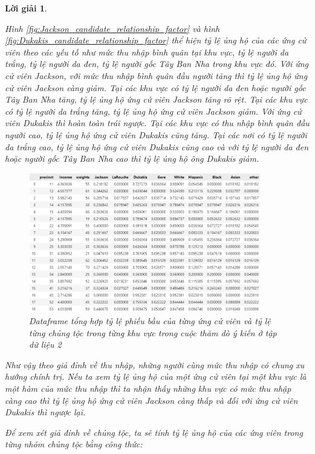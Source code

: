 \documentclass[14pt, a4paper]{article}
\theoremstyle{sltheorem}
\theoremstyle{soltheorem}
\newtheorem*{loigiai}{Lời giải}
\begin{document}
\begin{loigiai}
\begin{enumerate}
    Hình \ref{fig:Jackson_candidate_relationship_factor} và hình \ref{fig:Dukakis_candidate_relationship_factor} thể hiện tỷ lệ ủng hộ của các ứng cử viên theo các yếu tố như mức thu nhập bình quân tại khu vực, tỷ lệ người da trắng, tỷ lệ người da đen, tỷ lệ người gốc Tây Ban Nha trong khu vực đó.
    Với ứng cử viên Jackson, với mức thu nhập bình quân đầu người tăng thì tỷ lệ ủng hộ ứng cử viên Jackson càng giảm.
    Tại các khu vực có tỷ lệ người da đen hoặc người gốc Tây Ban Nha tăng, tỷ lệ ủng hộ ứng cứ viên Jackson tăng rõ rệt.
    Tại các khu vực có tỷ lệ người da trắng tăng, tỷ lệ ủng hộ ứng cử viên Jackson giảm.
    Với ứng cử viên Dukakis thì hoàn toàn trái ngược. Tại các khu vực có thu nhập bình quân đầu người cao, tỷ lệ ủng hộ ứng cử viên Dukakis cũng tăng.
    Tại các nơi có tỷ lệ người da trắng cao, tỷ lệ ủng hộ ứng cử viên Dukakis cũng cao và với tỷ lệ người da đen hoặc người gốc Tây Ban Nha cao thì tỷ lệ ủng hộ ông Dukakis giảm.

    \begin{figure}[H]
        \centering
        \includegraphics[width=0.9\textwidth]{figures/total_vote_df.png}
        \caption{Dataframe tổng hợp tỷ lệ phiếu bầu của từng ứng cử viên và tỷ lệ từng chủng tộc trong từng khu vực trong cuộc thăm dò ý kiến ở tập dữ liệu 2}
        \label{fig:total_vote_df}
    \end{figure}

    Như vậy theo giả đỉnh về thu nhập, những người cùng mức thu nhập có chung xu hướng chính trị.
    Nếu ta xem tỷ lệ ủng hộ của một ứng cử viên tại một khu vực là một hàm của mức thu nhập thì ta nhận thấy những khu vực có mức thu nhập càng cao thì tỷ lệ ủng hộ ứng cử viên Jackson càng thấp và đối với ứng cử viên Dukakis thì ngược lại.

    Để xem xét giả đỉnh về chủng tộc, ta sẽ tính tỷ lệ ủng hộ của các ứng viên trong từng nhóm chủng tộc bằng công thức:


\end{enumerate}
\end{loigiai}
\end{document}
